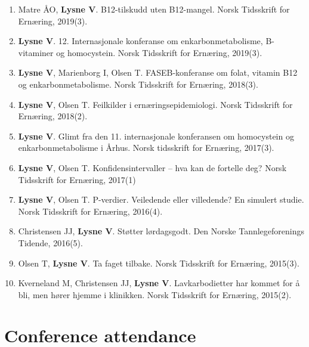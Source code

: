 \documentclass[11pt, a4paper]{awesome-cv}
\providecommand{\tightlist}{%
	\setlength{\itemsep}{0pt}\setlength{\parskip}{0pt}}
\begin{document}
\begin{enumerate}
\def\labelenumi{\arabic{enumi}.}
\tightlist
\item
  Matre ÅO, \textbf{Lysne V}. B12-tilskudd uten B12-mangel. Norsk Tidsskrift for Ernæring, 2019(3).
\item
  \textbf{Lysne V}. 12. Internasjonale konferanse om enkarbonmetabolisme, B-vitaminer og homocystein. Norsk Tidsskrift for Ernæring, 2019(3).
\item
  \textbf{Lysne V}, Marienborg I, Olsen T. FASEB-konferanse om folat, vitamin B12 og enkarbonmetabolisme. Norsk Tidsskrift for Ernæring, 2018(3).
\item
  \textbf{Lysne V}, Olsen T. Feilkilder i ernæringsepidemiologi. Norsk Tidsskrift for Ernæring, 2018(2).
\item
  \textbf{Lysne V}. Glimt fra den 11. internasjonale konferansen om homocystein og enkarbonmetabolisme i Århus. Norsk tidsskrift for Ernæring, 2017(3).
\item
  \textbf{Lysne V}, Olsen T. Konfidensintervaller -- hva kan de fortelle deg? Norsk Tidsskrift for Ernæring, 2017(1)
\item
  \textbf{Lysne V}, Olsen T. P-verdier. Veiledende eller villedende? En simulert studie. Norsk Tidsskrift for Ernæring, 2016(4).
\item
  Christensen JJ, \textbf{Lysne V}. Støtter lørdagsgodt. Den Norske Tannlegeforenings Tidende, 2016(5).
\item
  Olsen T, \textbf{Lysne V}. Ta faget tilbake. Norsk Tidsskrift for Ernæring, 2015(3).
\item
  Kverneland M, Christensen JJ, \textbf{Lysne V}. Lavkarbodietter har kommet for å bli, men hører hjemme i klinikken. Norsk Tidsskrift for Ernæring, 2015(2).
\end{enumerate}

\hypertarget{conference-attendance}{%
\section{Conference attendance}\label{conference-attendance}}
\end{document}
